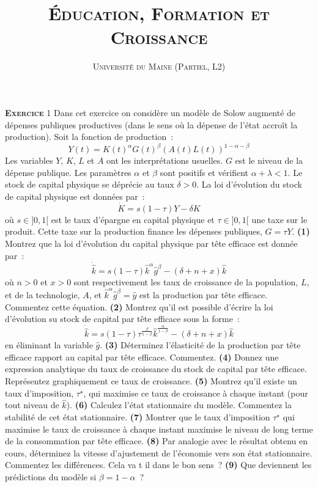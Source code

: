 \documentclass[10pt,a4paper,notitlepage]{article}
\newcommand{\exercice}[1]{\textsc{\textbf{Exercice}} #1}
\newcommand{\question}[1]{\textbf{(#1)}}
\begin{document}
\title{\textsc{Éducation, Formation et Croissance}}
\author{\textsc{Université du Maine (Partiel, L2)}}
\date{}

\maketitle

\exercice{1}  Dans  cet  exercice  on considère  un  modèle  de  Solow
augmenté de dépenses publiques productives (dans le sens où la dépense
de l'état accroît la production).  Soit la fonction de production :
\[
Y(t) = K(t)^{\alpha}G(t)^{\beta}(A(t)L(t))^{1-\alpha-\beta}
\]
Les variables $Y$,  $K$, $L$ et $A$ ont  les interprétations usuelles.
$G$ est le niveau de la  dépense publique.  Les paramètres $\alpha$ et
$\beta$ sont  positifs et  vérifient $\alpha+\lambda<1$.  Le  stock de
capital physique se  déprécie au taux $\delta>0$.   La loi d'évolution
du stock de capital physique est données par :
\[
\dot{K} = s (1-\tau)Y - \delta K
\]
où  $s\in]0,1[$  est   le  taux  d'épargne  en   capital  physique  et
$\tau\in]0,1[$ une taxe sur le  produit.  Cette taxe sur la production
finance les dépenses publiques, $G = \tau Y$. \question{1} Montrez que
la loi  d'évolution du capital  physique par tête efficace  est donnée
par :
\[
\dot{\hat{k}} = s(1-\tau)\hat{k}^{\alpha}\hat{g}^{\beta} - (\delta+n+x)\hat{k}
\]
où $n>0$  et $x>0$ sont  respectivement les  taux de croissance  de la
population,    $L$,     et    de     la    technologie,     $A$,    et
$\hat{k}^{\alpha}\hat{g}^{\beta}=\hat{y}$ est  la production  par tête
efficace.  Commentez cette  équation. \question{2}  Montrez qu'il  est
possible  d'écrire la  loi d'évolution  su stock  de capital  par tête
efficace sous la forme :
\[
\dot{\hat{k}} = s(1-\tau)\tau^{\frac{\beta}{1-\beta}}\hat{k}^{\frac{\alpha}{1-\beta}} - (\delta+n+x)\hat{k}
\]
en   éliminant  la   variable  $\hat   g$.   \question{3}   Déterminez
l'élasticité de la production par tête efficace rapport au capital par
tête  efficace.    Commentez.   \question{4}  Donnez   une  expression
analytique  du  taux  de  croissance  du stock  de  capital  par  tête
efficace.       Représentez     graphiquement      ce     taux      de
croissance. \question{5}  Montrez qu'il  existe un  taux d'imposition,
$\tau^{\star}$, qui  maximise ce taux  de croissance à  chaque instant
(pour  tout  niveau  de   $\hat  k$).   \question{6}  Calculez  l'état
stationnaire  du   modèle.   Commentez   la  stabilité  de   cet  état
stationnaire.    \question{7}  Montrer   que   le  taux   d'imposition
$\tau^{\star}$ qui  maximise le  taux de  croissance à  chaque instant
maximise  le  niveau  de  long  terme  de  la  consommation  par  tête
efficace. \question{8} Par analogie avec  le résultat obtenu en cours,
déterminez  la  vitesse  d'ajustement  de  l'économie  vers  son  état
stationnaire.  Commentez les  différences. Cela  va t  il dans  le bon
sens ? \question{9} Que deviennent les prédictions du modèle si $\beta = 1-\alpha$ ?
\end{document}
